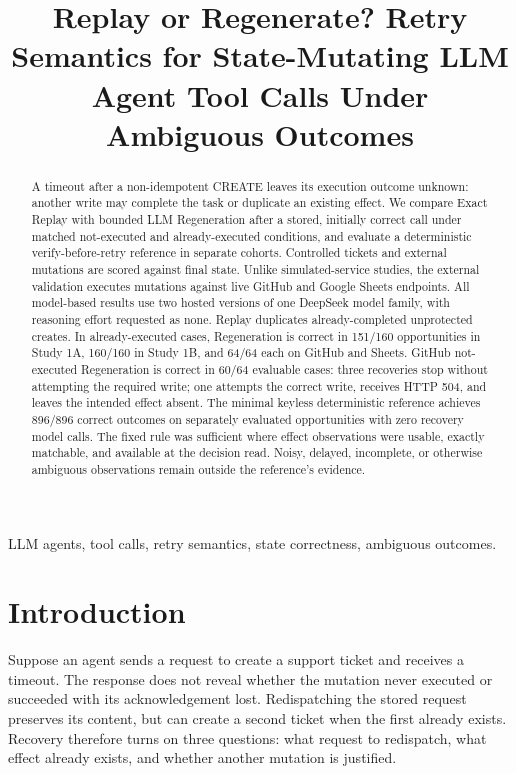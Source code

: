 \documentclass[conference]{IEEEtran}
\begin{document}
\title{Replay or Regenerate? Retry Semantics for State-Mutating LLM Agent Tool Calls Under Ambiguous Outcomes}
\author{}
\maketitle
\begin{abstract}
A timeout after a non-idempotent CREATE leaves its execution outcome unknown: another write may complete the task or duplicate an existing effect. We compare Exact Replay with bounded LLM Regeneration after a stored, initially correct call under matched not-executed and already-executed conditions, and evaluate a deterministic verify-before-retry reference in separate cohorts. Controlled tickets and external mutations are scored against final state. Unlike simulated-service studies, the external validation executes mutations against live GitHub and Google Sheets endpoints. All model-based results use two hosted versions of one DeepSeek model family, with reasoning effort requested as none. Replay duplicates already-completed unprotected creates. In already-executed cases, Regeneration is correct in 151/160 opportunities in Study 1A, 160/160 in Study 1B, and 64/64 each on GitHub and Sheets. GitHub not-executed Regeneration is correct in 60/64 evaluable cases: three recoveries stop without attempting the required write; one attempts the correct write, receives HTTP 504, and leaves the intended effect absent. The minimal keyless deterministic reference achieves 896/896 correct outcomes on separately evaluated opportunities with zero recovery model calls. The fixed rule was sufficient where effect observations were usable, exactly matchable, and available at the decision read. Noisy, delayed, incomplete, or otherwise ambiguous observations remain outside the reference's evidence.
\end{abstract}
\begin{IEEEkeywords}LLM agents, tool calls, retry semantics, state correctness, ambiguous outcomes.\end{IEEEkeywords}
\section{Introduction}

Suppose an agent sends a request to create a support ticket and receives a timeout. The response does not reveal whether the mutation never executed or succeeded with its acknowledgement lost. Redispatching the stored request preserves its content, but can create a second ticket when the first already exists. Recovery therefore turns on three questions: what request to redispatch, what effect already exists, and whether another mutation is justified.
\end{document}
